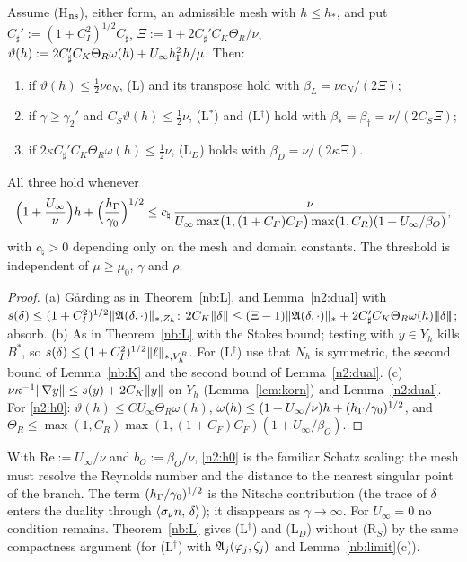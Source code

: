 \begin{theorem}\label{n2:L}
Assume (H$_{\rm ns}$), either form, an admissible mesh with $h\le h_\ast$, and put $C_\sharp':=(1+C_I^2)^{1/2}C_\sharp$, $\Xi:=1+2C_\sharp'C_K\Theta_R/\nu$, $\vartheta(h):=2C_\sharp'C_K\Theta_R\omega(h)+U_\infty h_\Gamma^2h/\mu$. Then:
\begin{enumerate}[label=(\alph*)]
\item if $\vartheta(h)\le\frac12\nu c_N$, (L) and its transpose hold with $\beta_L=\nu c_N/(2\Xi)$;
\item if $\gamma\ge\gamma_2'$ and $C_S\vartheta(h)\le\frac12\nu$, (L$^\ast$) and (L$^\dagger$) hold with $\beta_\ast=\beta_\dagger=\nu/(2C_S\Xi)$;
\item if $2\kappa C_\sharp'C_K\Theta_R\omega(h)\le\frac12\nu$, (L$_D$) holds with $\beta_D=\nu/(2\kappa\Xi)$.
\end{enumerate}
All three hold whenever
\begin{equation}\label{n2:h0}
\Bigl(1+\frac{U_\infty}\nu\Bigr)h+\Bigl(\frac{h_\Gamma}{\gamma_0}\Bigr)^{1/2}\le c_\natural\,\frac{\nu}{U_\infty\max\bigl(1,(1+C_F)C_F\bigr)\max(1,C_R)(1+U_\infty/\beta_O)},
\end{equation}
with $c_\natural>0$ depending only on the mesh and domain constants. The threshold is independent of $\mu\ge\mu_0$, $\gamma$ and $\rho$.
\end{theorem}

\begin{proof}
(a) G\aa rding as in Theorem~\ref{nb:L}, and Lemma~\ref{n2:dual} with $s(\delta)\le(1+C_I^2)^{1/2}\lVert \mathfrak A(\delta,\cdot)\rVert_{\ast,Z_h}$: $2C_K\lVert \delta\rVert\le(\Xi-1)\lVert \mathfrak A(\delta,\cdot)\rVert_\ast+2C_\sharp'C_K\Theta_R\omega(h)|\!|\!|\delta|\!|\!|$; absorb. (b) As in Theorem~\ref{nb:L} with the Stokes bound; testing with $y\in Y_h$ kills $B^\ast$, so $s(\delta)\le(1+C_I^2)^{1/2}\lVert \ell\rVert_{\ast,V_h^R}$. For (L$^\dagger$) use that $N_h$ is symmetric, the second bound of Lemma~\ref{nb:K} and the second bound of Lemma~\ref{n2:dual}. (c) $\nu\kappa^{-1}\lVert \nabla y\rVert\le s(y)+2C_K\lVert y\rVert$ on $Y_h$ (Lemma~\ref{lem:korn}) and Lemma~\ref{n2:dual}. For \eqref{n2:h0}: $\vartheta(h)\le CU_\infty\Theta_R\omega(h)$, $\omega(h)\le(1+U_\infty/\nu)h+(h_\Gamma/\gamma_0)^{1/2}$, and $\Theta_R\le\max(1,C_R)\max(1,(1+C_F)C_F)(1+U_\infty/\beta_O)$.
\end{proof}

With $\mathrm{Re}:=U_\infty/\nu$ and $b_O:=\beta_O/\nu$, \eqref{n2:h0} is the familiar Schatz scaling: the mesh must resolve the Reynolds number and the distance to the nearest singular point of the branch. The term $(h_\Gamma/\gamma_0)^{1/2}$ is the Nitsche contribution (the trace of $\delta$ enters the duality through $\langle \sigma_\nu n,\, \delta\rangle$); it disappears as $\gamma\to\infty$. For $U_\infty=0$ no condition remains. Theorem~\ref{nb:L} gives (L$^\dagger$) and (L$_D$) without (R$_S$) by the same compactness argument (for (L$^\dagger$) with $\mathfrak A_j(\varphi_j,\zeta_j)$ and Lemma~\ref{nb:limit}(c)).


